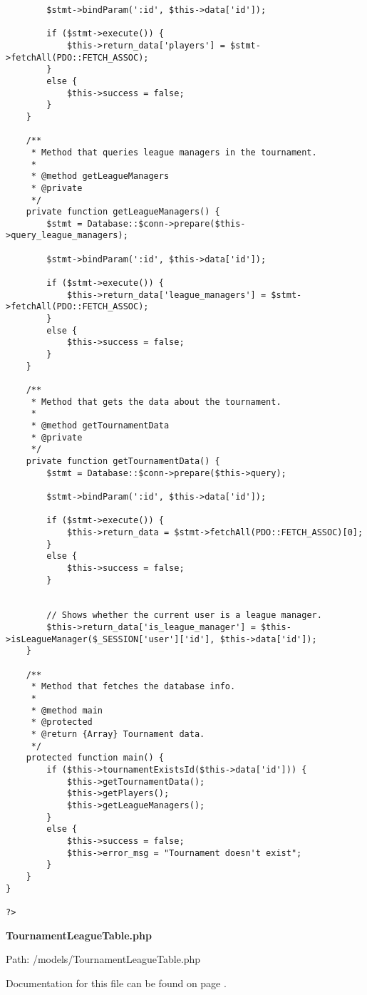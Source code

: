 {\begin{lstlisting}
		$stmt->bindParam(':id', $this->data['id']);

		if ($stmt->execute()) {
			$this->return_data['players'] = $stmt->fetchAll(PDO::FETCH_ASSOC);
		}
		else {
			$this->success = false;
		}
	}

	/**
	 * Method that queries league managers in the tournament.
	 *
	 * @method getLeagueManagers
	 * @private
	 */
	private function getLeagueManagers() {
		$stmt = Database::$conn->prepare($this->query_league_managers);

		$stmt->bindParam(':id', $this->data['id']);

		if ($stmt->execute()) {
			$this->return_data['league_managers'] = $stmt->fetchAll(PDO::FETCH_ASSOC);
		}
		else {
			$this->success = false;
		}
	}

	/**
	 * Method that gets the data about the tournament.
	 *
	 * @method getTournamentData
	 * @private
	 */
	private function getTournamentData() {
		$stmt = Database::$conn->prepare($this->query);

		$stmt->bindParam(':id', $this->data['id']);

		if ($stmt->execute()) {
			$this->return_data = $stmt->fetchAll(PDO::FETCH_ASSOC)[0];
		}
		else {
			$this->success = false;
		}


		// Shows whether the current user is a league manager.
		$this->return_data['is_league_manager'] = $this->isLeagueManager($_SESSION['user']['id'], $this->data['id']);
	}

	/**
	 * Method that fetches the database info.
	 *
	 * @method main
	 * @protected
	 * @return {Array} Tournament data.
	 */
	protected function main() {
		if ($this->tournamentExistsId($this->data['id'])) {
			$this->getTournamentData();
			$this->getPlayers();
			$this->getLeagueManagers();
		}
		else {
			$this->success = false;
			$this->error_msg = "Tournament doesn't exist";
		}
	}
}

?>\end{lstlisting}
}
\textbf{TournamentLeagueTable.php}\label{TournamentLeagueTable.php}

Path: /models/TournamentLeagueTable.php

Documentation for this file can be found on page \pageref{TournamentLeagueTable.php.doc}.

